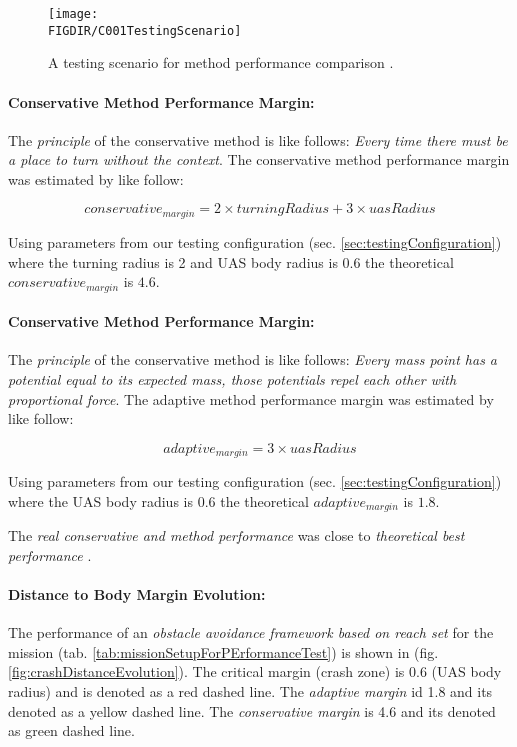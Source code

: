 \begin{figure}[H]
    \centering
    \texttt{[image: \\FIGDIR/C001TestingScenario]} 
    \caption{A testing scenario for method performance comparison \cite{hrdlik2018}.}
    \label{fig:avoidancePerformanceScenarioHrdlik}
\end{figure}

\paragraph{Conservative Method Performance Margin:} The \emph{principle} of the conservative method is like follows: \emph{Every time there must be a place to turn without the context}. The conservative method performance margin was estimated by \cite{hrdlik2018} like follow:

\begin{equation*}
    conservative_{margin} = 2 \times turning Radius +3 \times uas Radius
\end{equation*}

\noindent Using parameters from our testing configuration (sec. \ref{sec:testingConfiguration}) where the turning radius is 2 and UAS body radius is 0.6 the theoretical $conservative_{margin}$ is $4.6$.

\paragraph{Conservative Method Performance Margin:} The \emph{principle} of the conservative method is like follows: \emph{Every mass point has a potential equal to its expected mass, those potentials repel each other with proportional force}. The adaptive method performance margin was estimated by \cite{hrdlik2018} like follow:

\begin{equation*}
    adaptive_{margin} = 3\times uas Radius
\end{equation*}

\noindent Using parameters from our testing configuration (sec. \ref{sec:testingConfiguration}) where the UAS body radius is 0.6 the theoretical $adaptive_{margin}$ is $1.8$.

\begin{note}
    The \emph{real conservative and method performance}  was close to \emph{theoretical best performance} \cite{hrdlik2018}.
\end{note}

\paragraph{Distance to Body Margin Evolution:} The performance of an \emph{obstacle avoidance framework based on reach set} for the mission (tab. \ref{tab:missionSetupForPErformanceTest}) is shown in (fig. \ref{fig:crashDistanceEvolution}). The critical margin (crash zone) is 0.6 (UAS body radius) and is denoted as a red dashed line. The \emph{adaptive margin} id 1.8 and its denoted as a yellow dashed line. The \emph{conservative margin} is 4.6 and its denoted as green dashed line. 

